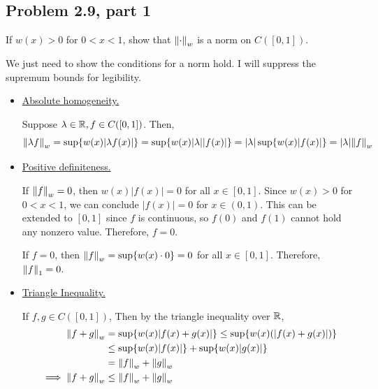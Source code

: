 \subsection{Problem 2.9, part 1}
If $w(x) > 0$ for $0 < x < 1$, show that $\norm{\cdot}_w$ is a norm on $C([0, 1])$.
\partbreak
\begin{solution}

    We just need to show the conditions for a norm hold. I will suppress the supremum bounds for legibility.
    \tightalignbreak
    \begin{itemize}[-]
        \item \underline{Absolute homogeneity.}

        \jump
        Suppose $\lambda \in \mathbb{R}, f \in C([0, 1])$. Then, 
        \[\norm{\lambda f}_w = \sup \{ w(x)|\lambda f(x)| \} = \sup \{ w(x)|\lambda| |f(x)| \} = |\lambda|\sup \{ w(x)|f(x)| \} = |\lambda| \norm{f}_w\]

        \item \underline{Positive definiteness.}

        \jump
        If $\norm{f}_w = 0$, then $w(x)|f(x)| = 0$ for all $x \in [0, 1]$. Since $w(x) > 0$ for $0 < x < 1$, we can conclude $|f(x)| = 0$ for $x \in (0, 1)$. This can be extended to $[0, 1]$ since $f$ is continuous, so $f(0)$ and $f(1)$ cannot hold any nonzero value. Therefore, $f = 0$.  \par

        \jump
        If $f = 0$, then $\norm{f}_w = \sup \{ w(x) \cdot 0 \} = 0$ for all $x \in [0, 1]$. Therefore, $\norm{f}_1 = 0$. 

        \item \underline{Triangle Inequality.}

        \jump
        If $f, g \in C([0, 1])$, Then by the triangle inequality over $\mathbb{R}$,
        \begin{align*}
            \norm{f + g}_w &= \sup \{ w(x)|f(x) + g(x)| \} \leq \sup \{ w(x) (|f(x) + g(x)|)\} \\
            &\leq \sup \{w(x)|f(x)|\} + \sup\{w(x)|g(x)|\}\\ 
            &= \norm{f}_w + \norm{g}_w \\ 
            \implies \norm{f + g}_w &\leq \norm{f}_w + \norm{g}_w
        \end{align*}
    \end{itemize}
\end{solution}

\newpage
